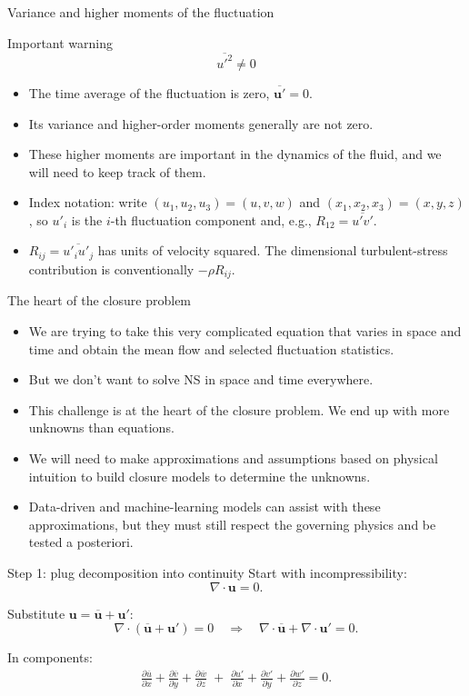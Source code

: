 \documentclass[aspectratio=169,11pt]{beamer}
\newcommand{\uu}{\bm{u}}
\newcommand{\avg}[1]{\overline{#1}}
\renewcommand{\up}{\uu'} %
\newcommand{\ubar}{\avg{\uu}}
\begin{document}
\begin{frame}{Variance and higher moments of the fluctuation}
\begin{block}{Important warning}
\[
\avg{u'^2}\neq 0
\]
\end{block}
\vfill
\begin{itemize}
  \item The time average of the fluctuation is zero, $\avg{\up}=0$.
  \item Its variance and higher-order moments generally are not zero.
  \item These higher moments are important in the dynamics of the fluid, and we will need to keep track of them.
  \item Index notation: write $(u_1,u_2,u_3)=(u,v,w)$ and $(x_1,x_2,x_3)=(x,y,z)$, so $u'_i$ is the $i$-th fluctuation component and, e.g., $R_{12}=\avg{u'v'}$.
  \item $R_{ij}=\avg{u'_i u'_j}$ has units of velocity squared. The dimensional turbulent-stress contribution is conventionally $-\rho R_{ij}$.
\end{itemize}
    
\end{frame}

\begin{frame}{The heart of the closure problem}
    \begin{itemize}
        \item We are trying to take this very complicated equation that varies in space and time and obtain the mean flow and selected fluctuation statistics.
        \item But we don't want to solve NS in space and time everywhere.
        \item This challenge is at the heart of the closure problem. We end up with more unknowns than equations.
        \item We will need to make approximations and assumptions based on physical intuition to build closure models to determine the unknowns.
        \item Data-driven and machine-learning models can assist with these approximations, but they must still respect the governing physics and be tested a posteriori.
    \end{itemize}
\end{frame}

\begin{frame}{Step 1: plug decomposition into continuity}
Start with incompressibility:
\[
\nabla\cdot\uu = 0.
\]

Substitute $\uu=\ubar+\up$:
\[
\nabla\cdot(\ubar+\up)=0
\quad\Rightarrow\quad
\nabla\cdot\ubar + \nabla\cdot\up = 0.
\]

In components:
\begin{align*}
\frac{\partial \avg{u}}{\partial x} + \frac{\partial \avg{v}}{\partial y} + \frac{\partial \avg{w}}{\partial z}
\;+\;
\frac{\partial u'}{\partial x} + \frac{\partial v'}{\partial y} + \frac{\partial w'}{\partial z}
=0.
\end{align*}

\end{frame}
\end{document}
